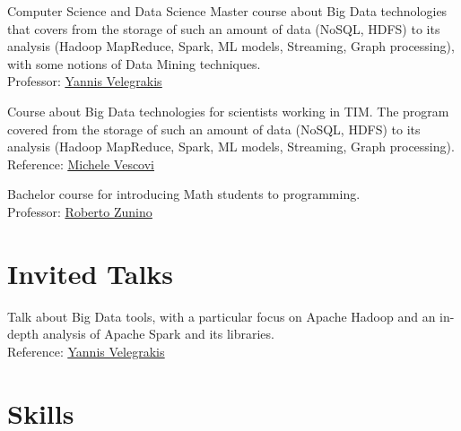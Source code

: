 \documentclass[10pt,a4paper,colorlinks,linkcolor=true]{moderncv}
\newcommand{\cvlink}[2]{\href{#1}{\ul{#2}}}
\begin{document}
  {Computer Science and Data Science Master course about Big Data technologies that covers from the storage of such an amount of data (NoSQL, HDFS) to its analysis (Hadoop MapReduce, Spark, ML models, Streaming, Graph processing), with some notions of Data Mining techniques.\\
  Professor: \cvlink{https://scholar.google.it/citations?user=FI1rYesAAAAJ}{Yannis Velegrakis}}

  {Course about Big Data technologies for scientists working in TIM. The program covered from the storage of such an amount of data (NoSQL, HDFS) to its analysis (Hadoop MapReduce, Spark, ML models, Streaming, Graph processing).\\
  Reference: \cvlink{https://www.linkedin.com/in/michele-vescovi/}{Michele Vescovi}}

  {Bachelor course for introducing Math students to programming.\\
  Professor: \cvlink{https://scholar.google.it/citations?user=ojru0uEAAAAJ}{Roberto Zunino}}


\section{Invited Talks}

  {Talk about Big Data tools, with a particular focus on Apache Hadoop and an in-depth analysis of Apache Spark and its libraries.\\
   Reference: \cvlink{https://scholar.google.it/citations?user=FI1rYesAAAAJ}{Yannis Velegrakis}}


\section{Skills}
\end{document}
